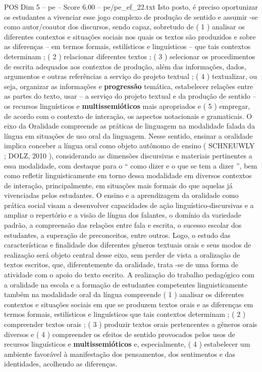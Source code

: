 \begin{textsample}{POS Dim 5 – pe – Score 6.00 – pe/pe\_ef\_22.txt}
Isto posto, é preciso oportunizar os estudantes a vivenciar esse jogo complexo de produção de sentido e assumir -se como autor/coautor dos discursos, sendo capaz, sobretudo de ( 1 ) analisar os diferentes contextos e situações sociais nos quais os textos são produzidos e sobre as diferenças – em termos formais, estilísticos e linguísticos – que tais contextos determinam ; ( 2 ) relacionar diferentes textos ; ( 3 ) selecionar os procedimentos de escrita adequados aos contextos de produção, além das informações, dados, argumentos e outras referências a serviço do projeto textual ; ( 4 ) textualizar, ou seja, organizar as informações e \textbf{progressão} temática, estabelecer relações entre as partes do texto, usar – a serviço do projeto textual e da produção de sentido – os recursos linguísticos e \textbf{multissemióticos} mais apropriados e ( 5 ) empregar, de acordo com o contexto de interação, os aspectos notacionais e gramaticais.
O eixo da Oralidade compreende as práticas de linguagem na modalidade falada da língua em situações de uso oral da linguagem.
Nesse sentido, ensinar a oralidade implica conceber a língua oral como objeto autônomo de ensino ( SCHNEUWLY ; DOLZ, 2010 ), considerando as dimensões discursivas e materiais pertinentes a essa modalidade, com destaque para o “ como dizer e o que se tem a dizer ”, bem como refletir linguisticamente em torno dessa modalidade em diversos contextos de interação, principalmente, em situações mais formais do que aquelas já vivenciadas pelos estudantes.
O ensino e a aprendizagem da oralidade como prática social visam a desenvolver capacidades de ação linguístico-discursivas e a ampliar o repertório e a visão de língua dos falantes, o domínio da variedade padrão, a compreensão das relações entre fala e escrita, o sucesso escolar dos estudantes, a superação de preconceitos, entre outros.
Logo, o estudo das características e finalidade dos diferentes gêneros textuais orais e seus modos de realização será objeto central desse eixo, sem perder de vista a oralização de textos escritos, que, diferentemente da oralidade, trata -se de uma forma de atividade com o apoio do texto escrito.
A realização do trabalho pedagógico com a oralidade na escola e a formação de estudantes competentes linguisticamente também na modalidade oral da língua compreende ( 1 ) analisar os diferentes contextos e situações sociais em que se produzem textos orais e as diferenças em termos formais, estilísticos e linguísticos que tais contextos determinam ; ( 2 ) compreender textos orais ; ( 3 ) produzir textos orais pertencentes a gêneros orais diversos e ( 4 ) compreender os efeitos de sentido provocados pelos usos de recursos linguísticos e \textbf{multissemióticos} e, especialmente, ( 4 ) estabelecer um ambiente favorável à manifestação dos pensamentos, dos sentimentos e das identidades, acolhendo as diferenças.

\end{textsample}
